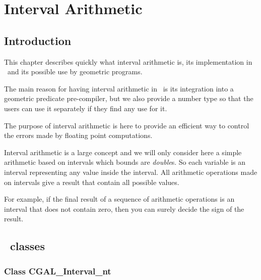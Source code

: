 \chapter{Interval Arithmetic}

\section{Introduction}

This chapter describes quickly what interval arithmetic is, its implementation
in \cgal\ and its possible use by geometric programs.

The main reason for having interval arithmetic in \cgal\ is its integration
into a geometric predicate pre-compiler, but we also provide a number type so
that the users can use it separately if they find any use for it.

The purpose of interval arithmetic is here to provide an efficient way to
control the errors made by floating point computations.

Interval arithmetic is a large concept and we will only consider here a simple
arithmetic based on intervals which bounds are {\it double}s.
So each variable is an interval representing any value inside the interval.
All arithmetic operations made on intervals give a result that contain all
possible values.

\smallskip

For example, if the final result of a sequence of arithmetic operations is an
interval that does not contain zero, then you can surely decide the sign of the
result.

\section{\cgal\ classes}

\subsection {Class CGAL\_Interval\_nt}

